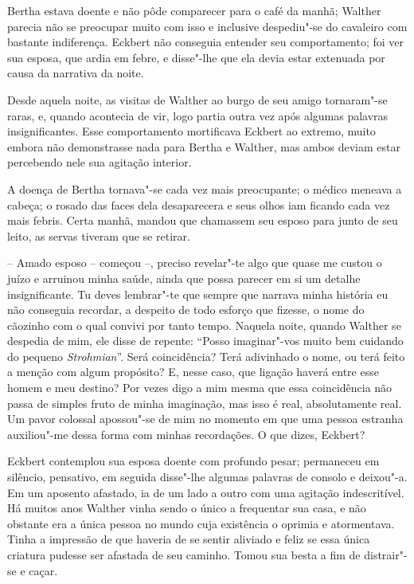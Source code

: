  Bertha estava doente e não pôde comparecer para o café da manhã;
Walther parecia não se preocupar muito com isso e inclusive despediu"-se
do cavaleiro com bastante indiferença. Eckbert não conseguia entender
seu comportamento; foi ver sua esposa, que ardia em febre, e disse"-lhe
que ela devia estar extenuada por causa da narrativa da noite.

 Desde aquela noite, as visitas de Walther ao burgo de seu amigo
tornaram"-se raras, e, quando acontecia de vir, logo partia outra vez
após algumas palavras insignificantes. Esse comportamento mortificava
Eckbert ao extremo, muito embora não demonstrasse nada para Bertha e
Walther, mas ambos deviam estar percebendo nele sua agitação interior.

 A doença de Bertha tornava"-se cada vez mais preocupante; o médico
meneava a cabeça; o rosado das faces dela
desaparecera e seus olhos iam ficando cada vez mais febris. Certa
manhã, mandou que chamassem seu esposo para junto de seu leito, as
servas tiveram que se retirar.

 -- Amado esposo -- começou --, preciso revelar"-te algo que quase me custou
o juízo e arruinou minha saúde, ainda que possa parecer em si um
detalhe insignificante. Tu deves lembrar"-te que sempre que narrava
minha história eu não conseguia recordar, a despeito de todo esforço
que fizesse, o nome do cãozinho com o qual convivi por tanto tempo.
Naquela noite, quando Walther se despedia de mim, ele disse de repente:
``Posso imaginar"-vos muito bem cuidando do pequeno \textit{Strohmian}''.
Será coincidência? Terá adivinhado o nome, ou terá feito a menção com
algum propósito? E, nesse caso, que ligação haverá entre esse homem e
meu destino? Por vezes digo a mim mesma que essa coincidência não passa
de simples fruto de minha imaginação, mas isso é real, absolutamente
real. Um pavor colossal apossou"-se de mim no momento em que uma pessoa
estranha auxiliou"-me dessa forma com minhas recordações. O que dizes,
Eckbert?

 Eckbert contemplou sua esposa doente com profundo pesar; permaneceu em
silêncio, pensativo, em seguida disse"-lhe algumas palavras de consolo e
deixou"-a. Em um aposento afastado, ia de um lado a outro com uma
agitação indescritível. Há muitos anos Walther vinha sendo o único a
frequentar sua casa, e não obstante era a única pessoa no mundo cuja
existência o oprimia e atormentava. Tinha a impressão de que haveria de
se sentir aliviado e feliz se essa única criatura pudesse ser afastada
de seu caminho. Tomou sua besta a fim de distrair"-se e caçar.

